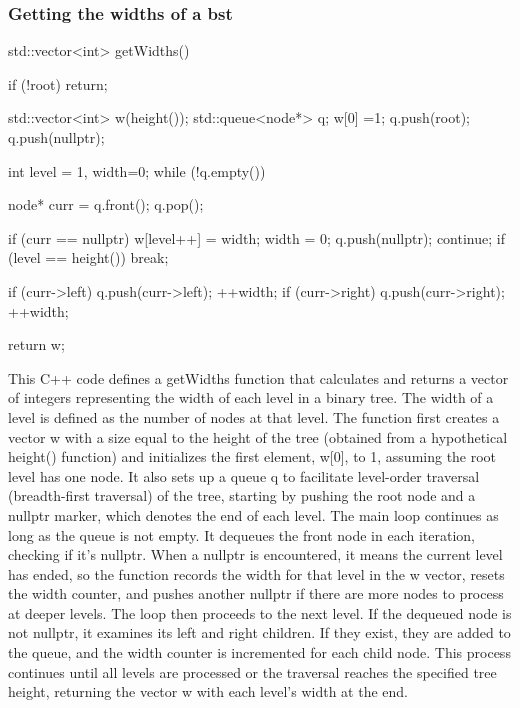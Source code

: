 \documentclass{report}
\begin{document}
    \subsubsection{Getting the widths of a bst}
    \bigbreak \noindent 
    \begin{cppcode}
        std::vector<int> getWidths() {
            if (!root) return;

            std::vector<int> w(height());
            std::queue<node*> q;
            w[0] =1;
            q.push(root);
            q.push(nullptr);

            int level = 1, width=0;
            while (!q.empty()) {
                node* curr = q.front();
                q.pop();

                if (curr == nullptr) {
                    w[level++] = width;
                    width = 0;
                    q.push(nullptr);
                    continue;
                }
                if (level == height()) {
                    break;
                }

                if (curr->left) {
                    q.push(curr->left);
                    ++width;
                }
                if (curr->right) {
                    q.push(curr->right);
                    ++width;
                }
            }
            return w;
        }
    \end{cppcode}
    \bigbreak \noindent 
    This C++ code defines a getWidths function that calculates and returns a vector of integers representing the width of each level in a binary tree. The width of a level is defined as the number of nodes at that level.
    \bigbreak \noindent 
    The function first creates a vector w with a size equal to the height of the tree (obtained from a hypothetical height() function) and initializes the first element, w[0], to 1, assuming the root level has one node. It also sets up a queue q to facilitate level-order traversal (breadth-first traversal) of the tree, starting by pushing the root node and a nullptr marker, which denotes the end of each level.
    \bigbreak \noindent 
    The main loop continues as long as the queue is not empty. It dequeues the front node in each iteration, checking if it’s nullptr. When a nullptr is encountered, it means the current level has ended, so the function records the width for that level in the w vector, resets the width counter, and pushes another nullptr if there are more nodes to process at deeper levels. The loop then proceeds to the next level.
    \bigbreak \noindent 
    If the dequeued node is not nullptr, it examines its left and right children. If they exist, they are added to the queue, and the width counter is incremented for each child node. This process continues until all levels are processed or the traversal reaches the specified tree height, returning the vector w with each level’s width at the end.
\end{document}
